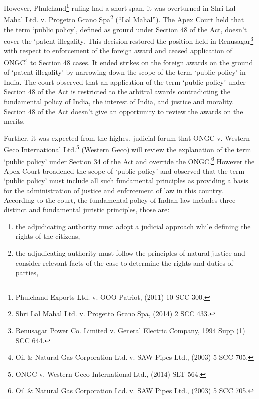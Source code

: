\begin{multicols}{2}
\vspace{-.1cm}

\noi
However, Phulchand\footnote{Phulchand Exports Ltd. v. OOO Patriot, (2011) 10 SCC 300.} ruling had a short span, it was overturned in Shri Lal Mahal Ltd. v.
Progetto Grano Spa\footnote{Shri Lal Mahal Ltd. v. Progetto Grano Spa, (2014) 2 SCC 433.} (“Lal Mahal”). The Apex Court held that the term ‘public policy’,
defined as ground under Section 48 of the Act, doesn’t cover the ‘patent illegality. This
decision restored the position held in Renusagar\footnote{Renusagar Power Co. Limited v. General Electric Company, 1994 Supp (1) SCC 644.} with respect to enforcement of the foreign
award and ceased application of ONGC\footnote{Oil \& Natural Gas Corporation Ltd. v. SAW Pipes Ltd., (2003) 5 SCC 705.} to Section 48 cases. It ended strikes on the foreign
awards on the ground of ‘patent illegality’ by narrowing down the scope of the term ‘public
policy’ in India. The court observed that an application of the term ‘public policy’ under
Section 48 of the Act is restricted to the arbitral awards contradicting the fundamental policy of India, the interest of India, and justice and morality. Section 48 of the Act doesn’t give an
opportunity to review the awards on the merits.

\vspace{-.1cm}

\noi
Further, it was expected from the highest judicial forum that ONGC v. Western Geco
International Ltd.\footnote{ONGC v. Western Geco International Ltd., (2014) SLT 564.} (Western Geco) will review the explanation of the term ‘public policy’
under Section 34 of the Act and override the ONGC.\footnote{Oil \& Natural Gas Corporation Ltd. v. SAW Pipes Ltd., (2003) 5 SCC 705.} However the Apex Court broadened
the scope of ‘public policy’ and observed that the term ‘public policy’ must include all such
fundamental principles as providing a basis for the administration of justice and enforcement
of law in this country. According to the court, the fundamental policy of Indian law includes
three distinct and fundamental juristic principles, those are:

\vspace{-.35cm}

\begin{enumerate}[label=$\alph*)$]
\itemsep=0pt
\item the adjudicating authority must adopt a judicial approach while defining the rights of the citizens,

\item the adjudicating authority must follow the principles of natural justice and consider relevant facts of the case to determine the rights and duties of parties,


\end{enumerate}
\end{multicols}

